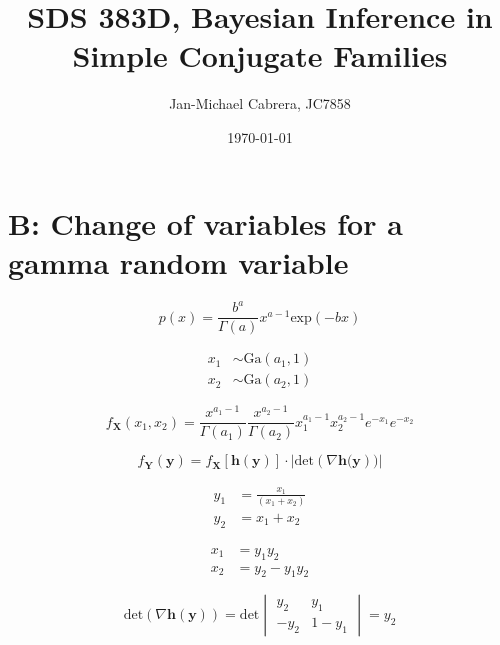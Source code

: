 \documentclass[12pt]{article}
\begin{document}
    \title{SDS 383D, Bayesian Inference in Simple Conjugate Families}
    \author{Jan-Michael Cabrera, JC7858}
    \date{\today}
    \maketitle

    \section*{B: Change of variables for a gamma random variable}

        \begin{equation}
              p(x) = \frac{b^a}{\Gamma(a)}x^{a-1} \text{exp}(-bx)
        \end{equation}

        \begin{align}
              x_1 &\sim \text{Ga}(a_1, 1)\\
              x_2 &\sim \text{Ga}(a_2, 1)
        \end{align}

        \begin{equation}
              f_{\mathbf{X}}(x_1, x_2) = \frac{x^{a_1-1}}{\Gamma(a_1)}\frac{x^{a_2-1}}{\Gamma(a_2)}x_1^{a_1-1} x_2^{a_2-1} e^{-x_1}e^{-x_2}
        \end{equation}

        \begin{equation}
              f_{\mathbf{Y}}(\mathbf{y}) = f_{\mathbf{X}}[\mathbf{h(y)}]\cdot|\text{det}(\nabla \mathbf{h(y}))|
        \end{equation}

        \begin{align}
              y_1 &= \frac{x_1}{(x_1+x_2)} \\
              y_2 &= x_1 + x_2
        \end{align}

        \begin{align}
              x_1 &= y_1 y_2 \\
              x_2 &= y_2 - y_1 y_2
        \end{align}

        \begin{equation}
              \text{det}(\nabla \mathbf{h(y)}) = \text{det}
              \begin{vmatrix}
              y_2 & y_1 \\
              -y_2 & 1-y_1
              \end{vmatrix}
              = y_2
        \end{equation}
\end{document}
